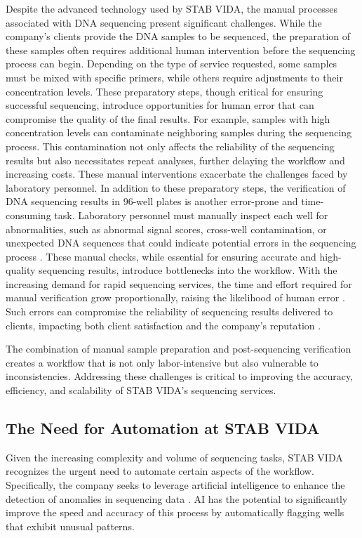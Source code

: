 Despite the advanced technology used by STAB VIDA, the manual processes associated with DNA sequencing present significant challenges. While the company’s clients provide the DNA samples to be sequenced, the preparation of these samples often requires additional human intervention before the sequencing process can begin. Depending on the type of service requested, some samples must be mixed with specific primers, while others require adjustments to their concentration levels. These preparatory steps, though critical for ensuring successful sequencing, introduce opportunities for human error that can compromise the quality of the final results.
For example, samples with high concentration levels can contaminate neighboring samples during the sequencing process. This contamination not only affects the reliability of the sequencing results but also necessitates repeat analyses, further delaying the workflow and increasing costs. These manual interventions exacerbate the challenges faced by laboratory personnel.
In addition to these preparatory steps, the verification of DNA sequencing results in 96-well plates is another error-prone and time-consuming task. Laboratory personnel must manually inspect each well for abnormalities, such as abnormal signal scores, cross-well contamination, or unexpected DNA sequences that could indicate potential errors in the sequencing process \cite{Chakravarthy2020}. These manual checks, while essential for ensuring accurate and high-quality sequencing results, introduce bottlenecks into the workflow. With the increasing demand for rapid sequencing services, the time and effort required for manual verification grow proportionally, raising the likelihood of human error \cite{Batista2021}. Such errors can compromise the reliability of sequencing results delivered to clients, impacting both client satisfaction and the company’s reputation \cite{Kumar2018}.

The combination of manual sample preparation and post-sequencing verification creates a workflow that is not only labor-intensive but also vulnerable to inconsistencies. Addressing these challenges is critical to improving the accuracy, efficiency, and scalability of STAB VIDA’s sequencing services.
\subsection{The Need for Automation at STAB VIDA}

Given the increasing complexity and volume of sequencing tasks, STAB VIDA recognizes the urgent need to automate certain aspects of the workflow. Specifically, the company seeks to leverage artificial intelligence to enhance the detection of anomalies in sequencing data \cite{Jiang2021}. AI has the potential to significantly improve the speed and accuracy of this process by automatically flagging wells that exhibit unusual patterns.

